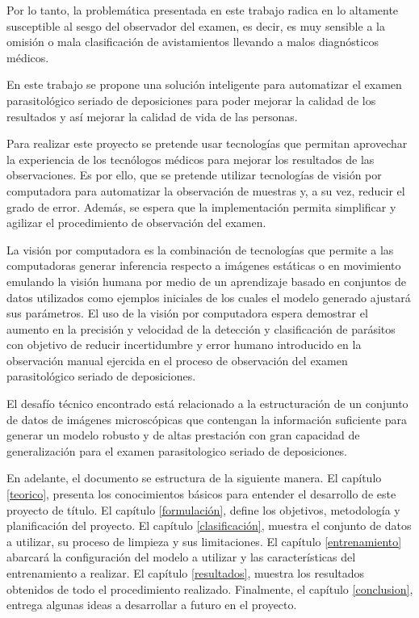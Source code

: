 \documentclass[letter,12pt]{report}
\begin{document}
Por lo tanto, la problemática presentada en este trabajo radica en lo altamente
susceptible al sesgo del observador del examen, es decir, es muy sensible a la
omisión o mala clasificación de avistamientos llevando a malos diagnósticos
médicos. 

En este trabajo se propone una solución inteligente para automatizar el examen
parasitológico seriado de deposiciones para poder mejorar la calidad de los
resultados y así mejorar la calidad de vida de las personas.

Para realizar este proyecto se pretende usar tecnologías que permitan aprovechar la
experiencia de los tecnólogos médicos para mejorar los resultados de las
observaciones.  Es por ello, que se pretende utilizar tecnologías de visión por
computadora para automatizar la observación de muestras y, a su vez, reducir el grado
de error. Además, se espera que la implementación permita simplificar y agilizar el
procedimiento de observación del examen.

La visión por computadora es la combinación de tecnologías que permite a las
computadoras generar inferencia respecto a imágenes estáticas o en movimiento
emulando la visión humana por medio de un aprendizaje basado en conjuntos de datos
utilizados como ejemplos iniciales de los cuales el modelo generado ajustará sus
parámetros.  El uso de la visión por computadora espera demostrar el aumento en la
precisión y velocidad de la detección y clasificación de parásitos con objetivo de
reducir incertidumbre y error humano introducido en la observación manual ejercida en
el proceso de observación del examen parasitológico seriado de deposiciones. 

El desafío técnico encontrado está relacionado a la estructuración de un conjunto de
datos de imágenes microscópicas que contengan la información suficiente para generar
un modelo robusto y de altas prestación con gran capacidad de generalización para el
examen parasitologico seriado de deposiciones.

En adelante, el documento se estructura de la siguiente manera. El capítulo
\ref{teorico}, presenta los conocimientos básicos para entender el desarrollo
de este proyecto de título. El capítulo \ref{formulación}, define los
objetivos, metodología y planificación del proyecto. El capítulo
\ref{clasificación}, muestra el conjunto de datos a utilizar, su proceso de
limpieza y sus limitaciones. El capítulo \ref{entrenamiento} abarcará la
configuración del modelo a utilizar y las características del entrenamiento a
realizar. El capítulo \ref{resultados}, muestra los resultados obtenidos de
todo el procedimiento realizado. Finalmente, el capítulo \ref{conclusion},
entrega algunas ideas a desarrollar a futuro en el proyecto.
\end{document}
